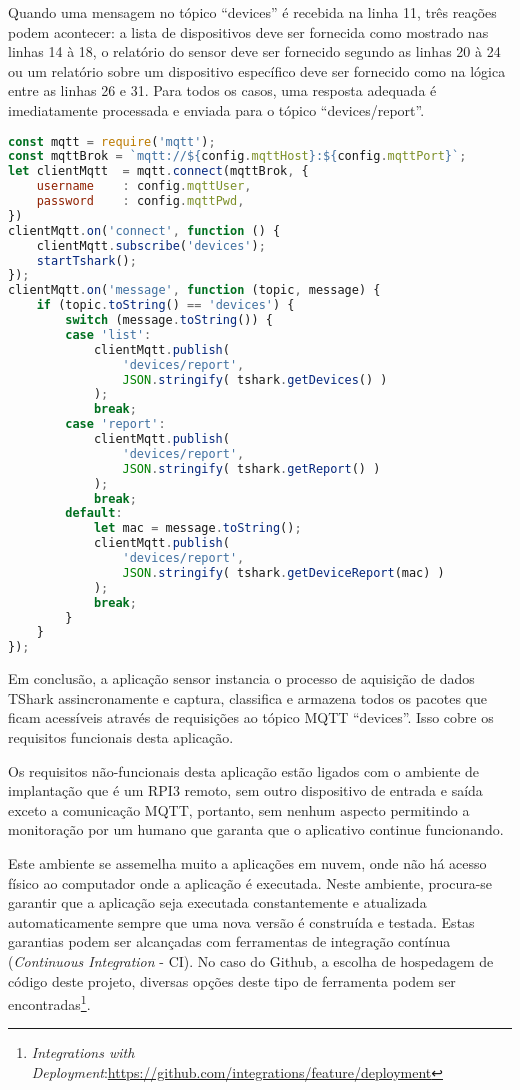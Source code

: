Quando uma mensagem no tópico ``devices'' é recebida na linha 11, três reações
podem acontecer: a lista de dispositivos deve ser fornecida como mostrado nas
linhas 14 à 18, o relatório do sensor deve ser fornecido segundo as linhas 20 à
24 ou um relatório sobre um dispositivo específico deve ser fornecido como na
lógica entre as linhas 26 e 31. Para todos os casos, uma resposta adequada é
imediatamente processada e enviada para o tópico ``devices/report''.

\begin{lstlisting}[language=javascript,caption={Cliente MQTT.js},label=code-mqttjs-client]
const mqtt = require('mqtt');
const mqttBrok = `mqtt://${config.mqttHost}:${config.mqttPort}`;
let clientMqtt	= mqtt.connect(mqttBrok, {
	username	: config.mqttUser,
	password	: config.mqttPwd,
})
clientMqtt.on('connect', function () {
	clientMqtt.subscribe('devices');
	startTshark();
});
clientMqtt.on('message', function (topic, message) {
	if (topic.toString() == 'devices') {
		switch (message.toString()) {
		case 'list':
			clientMqtt.publish(
				'devices/report',
				JSON.stringify( tshark.getDevices() )
			);
			break;
		case 'report':
			clientMqtt.publish(
				'devices/report',
				JSON.stringify( tshark.getReport() )
			);
			break;
		default:
			let mac = message.toString();
			clientMqtt.publish(
				'devices/report',
				JSON.stringify( tshark.getDeviceReport(mac) )
			);
			break;
		}
	}
});
\end{lstlisting}

Em conclusão, a aplicação sensor instancia o processo de aquisição de dados
TShark assincronamente e captura, classifica e armazena todos os pacotes
que ficam acessíveis através de requisições ao tópico MQTT ``devices''.
Isso cobre os requisitos funcionais desta aplicação.

Os requisitos não-funcionais desta aplicação estão ligados com o ambiente de
implantação que é um RPI3 remoto, sem outro dispositivo de entrada e saída
exceto a comunicação MQTT, portanto, sem nenhum aspecto permitindo a
monitoração por um humano que garanta que o aplicativo continue funcionando.

Este ambiente se assemelha muito a aplicações em nuvem, onde não há acesso
físico ao computador onde a aplicação é executada. Neste ambiente, procura-se
garantir que a aplicação seja executada constantemente e atualizada
automaticamente sempre que uma nova versão é construída e testada. Estas
garantias podem ser alcançadas com ferramentas de integração contínua
(\emph{Continuous Integration} - CI). No caso do Github, a escolha de hospedagem
de código deste projeto, diversas opções deste tipo de ferramenta podem ser
encontradas\footnote{\emph{Integrations with Deployment}:\url{https://github.com/integrations/feature/deployment}}.

